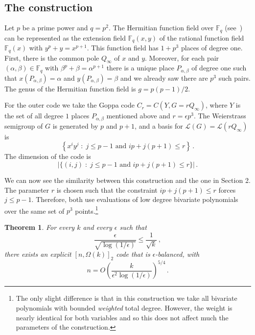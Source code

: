 \documentclass[10pt]{article}
\newtheorem{theorem}{Theorem}[section]
\theoremstyle{definition}
\numberwithin{equation}{section}
\newcommand{\Fq}{{\mathbb{F}_q}}
\newcommand{\cL}{\mathcal{L}}
\newcommand{\eps}{\epsilon}
\newcommand{\set}[1]{{\left\{#1\right\}}}
\newcommand{\Pl}{{Y}}
\begin{document}
\subsection{The construction}
Let $p$ be a prime power and $q=p^2$. The Hermitian function field
over $\Fq $ (see~\cite[Lemma VI.4.4]{S:93}) can be represented as
the extension field $\Fq (x,y)$ of the rational function field
$\Fq(x)$ with $y^p + y = x^{p+1}$. This function field has $1+p^3$
places of degree one. First, there is the common pole $Q_\infty$ of
$x$ and $y$. Moreover, for each pair $(\alpha, \beta)\in \Fq$ with
$\beta^p + \beta = \alpha^{p+1}$ there is a unique place
$P_{\alpha,\beta}$ of degree one such that $x(P_{\alpha,\beta}) =
\alpha$ and $y(P_{\alpha,\beta}) = \beta$ and we already saw there
are $p^3$ such pairs. The genus of the Hermitian function field is
$g=p(p-1)/2$.

For the outer code we take the Goppa code $C_r =
C(\Pl,G=rQ_\infty)$, where $\Pl$ is the set of all degree $1$ places
$P_{\alpha,\beta}$ mentioned above and $r=\eps p^3$.
%
%
%
%
The Weierstrass semigroup of $G$ is generated by $p$ and $p+1$,
and a basis for $\cL(G)=\cL(r Q_\infty)$ is $$\set{x^i y^j \;:\;
\text{$j\le p-1$ and $ip+j(p+1)\le r$}}\,.$$ The dimension of the
code is
$$\big|\{(i,j)\;:\; \text{$j\le p-1$ and $ip+j(p+1)\le r$}\} \big|\,.$$

We can now see the similarity between this construction and the one
in Section 2. The parameter $r$ is chosen such that
the constraint $ip+j(p+1)\le r$ forces  $j \le p-1$. Therefore, both
use evaluations of low degree bivariate polynomials over the same
set of $p^3$ points.\footnote{The only slight difference is that in
this construction we take all bivariate polynomials with bounded
\emph{weighted} total degree. However, the weight is nearly
identical for both variables and so this does not affect much the
parameters of the construction.}

\begin{theorem}
For every $k$ and every $\eps$ such that 
\[
\frac{\eps}
{\sqrt{\log(1/\eps)}} \le \frac{1}{\sqrt{k}}\,,
\]
there exists an
explicit $[n,\Omega(k)]_2$ code that is $\eps$-balanced, with
\[
n=O\left(\frac{k}{\eps^2 \log(1/\eps)}\right)^{5/4}\,.
\]
\end{theorem}
\end{document}

